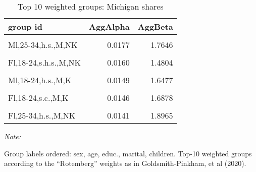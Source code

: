 \begin{table}

\caption{\label{tab:rotweights:michigan}Top 10 weighted groups: Michigan shares}
\centering
\begin{threeparttable}
\begin{tabular}[t]{lrr}
\toprule
group id & AggAlpha & AggBeta\\
\midrule
\cellcolor{gray!6}{Ml,18-24,h.s.,M,NK} & \cellcolor{gray!6}{0.0330} & \cellcolor{gray!6}{1.5574}\\
\addlinespace
Ml,25-34,h.s.,M,NK & 0.0177 & 1.7646\\
\addlinespace
\cellcolor{gray!6}{Ml,18-24,c+,M,NK} & \cellcolor{gray!6}{0.0174} & \cellcolor{gray!6}{1.5920}\\
\addlinespace
Fl,18-24,s.h.s.,M,NK & 0.0160 & 1.4804\\
\addlinespace
\cellcolor{gray!6}{Ml,18-24,s.c.,M,NK} & \cellcolor{gray!6}{0.0155} & \cellcolor{gray!6}{1.4664}\\
\addlinespace
Ml,18-24,h.s.,M,K & 0.0149 & 1.6477\\
\addlinespace
\cellcolor{gray!6}{Fl,18-24,h.s.,M,NK} & \cellcolor{gray!6}{0.0146} & \cellcolor{gray!6}{1.6288}\\
\addlinespace
Fl,18-24,s.c.,M,K & 0.0146 & 1.6878\\
\addlinespace
\cellcolor{gray!6}{Ml,35-49,s.c.,M,NK} & \cellcolor{gray!6}{0.0146} & \cellcolor{gray!6}{1.4254}\\
\addlinespace
Fl,25-34,h.s.,M,NK & 0.0141 & 1.8965\\
\bottomrule
\end{tabular}
\begin{tablenotes}
\item \textit{Note: } 
\item Group labels ordered: sex, age, educ., marital, children. Top-10 weighted groups according to the ``Rotemberg'' weights as in Goldsmith-Pinkham, et al (2020).
\end{tablenotes}
\end{threeparttable}
\end{table}
